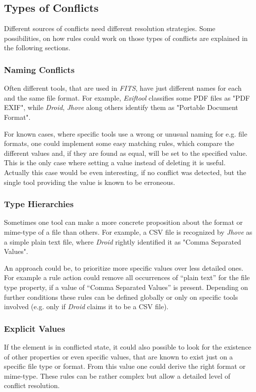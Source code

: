 \documentclass[a4paper,12pt]{article}
\begin{document}
\subsection{Types of Conflicts}
Different sources of conflicts need different resolution strategies. Some possibilities, on how rules could work on those types of conflicts are explained in the following sections.

\subsubsection{Naming Conflicts}

Often different tools, that are used in \emph{FITS}, have just different names for each and the same file format. For example, \emph{Exiftool} classifies some PDF files as "PDF EXIF", while \emph{Droid}, \emph{Jhove} along others identify them as "Portable Document Format".

For known cases, where specific tools use a wrong or unusual naming for e.g. file formats, one could implement some easy matching rules, which compare the different values and, if they are found as equal, will be set to the specified value. This is the only case where setting a value instead of deleting it is useful. Actually this case would be even interesting, if no conflict was detected, but the single tool providing the value is known to be erroneous.

\subsubsection{Type Hierarchies}

Sometimes one tool can make a more concrete proposition about the format or mime-type of a file than others. For example, a CSV file is recognized by \emph{Jhove} as a simple plain text file, where \emph{Droid} rightly identified it as "Comma Separated Values".

An approach could be, to prioritize more specific values over less detailed ones. For example a rule action could remove all occurrences of ``plain text'' for the file type property, if a value of ``Comma Separated Values'' is present. Depending on further conditions these rules can be defined globally or only on specific tools involved (e.g. only if \emph{Droid} claims it to be a CSV file).

\subsubsection{Explicit Values}
If the element is in conflicted state, it could also possible to look for the existence of other properties or even specific values, that are known to exist just on a specific file type or format. From this value one could derive the right format or mime-type. These rules can be rather complex but allow a detailed level of conflict resolution.
\end{document}

